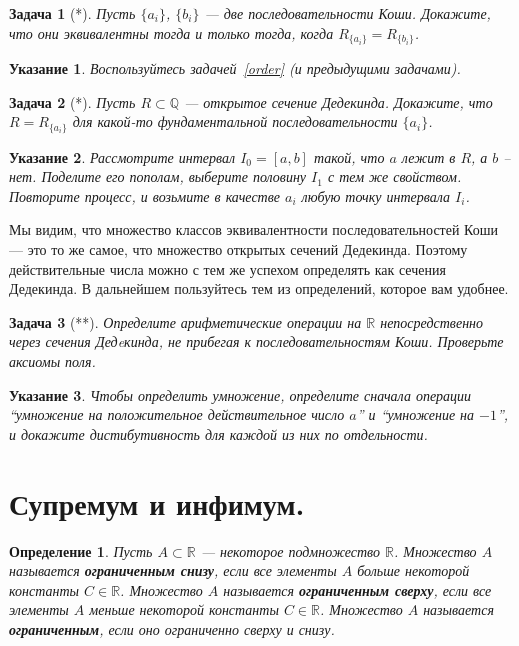 \documentclass[12pt]{book}
\newcommand{\subs}{\section}
\def\R{{\mathbb R}}
\def\Q{{\mathbb Q}}
\theoremstyle{upshape}
\newtheorem{zadacha}{Задача}[chapter]
\theoremstyle{generic}
\newtheorem{opredelenie}[teorema]{Определение}
\theoremstyle{upshapenonumber}
\newtheorem{ukazanie}{Указание}[section]
\newcommand{\следствие}{%
     \refstepcounter{teorema}
     {\noindent\bf Следствие \thechapter.\arabic{teorema}:\ }}
\newcommand{\пример}{%
     \refstepcounter{teorema}
     {\noindent\bf Пример \thechapter.\arabic{teorema}:\ }}
\newcommand{\лемма}{%
     \refstepcounter{teorema}
     {\noindent\bf Лемма \thechapter.\arabic{teorema}:\ }}
\newcommand{\теорема}{%
     \refstepcounter{teorema}
     {\noindent\bf Теорема \thechapter.\arabic{teorema}:\ }}
\newcommand{\утверждение}{%
     \refstepcounter{teorema}
     {\noindent\bf Утверждение \thechapter.\arabic{teorema}:\ }}
\begin{document}
\begin{zadacha}[*] Пусть $\{ a_i\}$, $\{b_i\}$ --- две последовательности
Коши. Докажите, что они эквивалентны тогда и только тогда, когда 
$R_{\{ a_i\}} = R_{\{ b_i\}}$.
\end{zadacha}

\begin{ukazanie}
Воспользуйтесь задачей~\ref{order} (и предыдущими задачами).
\end{ukazanie}

\begin{zadacha}[*]
Пусть $R \subset \Q$ --- открытое сечение Дедекинда. Докажите, что $R
= R_{\{a_i\}}$ для какой-то фундаментальной последовательности
$\{a_i\}$.
\end{zadacha}

\begin{ukazanie}
Рассмотрите интервал $I_0=[a,b]$ такой, что $a$ лежит в $R$, а $b$ --
нет. Поделите его пополам, выберите половину $I_1$ с тем же
свойством. Повторите процесс, и возьмите в качестве $a_i$ любую
точку интервала $I_i$.
\end{ukazanie} 

Мы видим, что множество классов эквивалентности последовательностей
Коши --- это то же самое, что множество открытых сечений
Дедекинда. Поэтому действительные числа можно с тем же успехом
определять как сечения Дедекинда. В дальнейшем пользуйтесь тем из
определений, которое вам удобнее.

\begin{zadacha}[**]
Определите арифметические операции на $\R$ непосредственно через
сечения Дедeкинда, не прибегая к последовательностям Коши. Проверьте
аксиомы поля.
\end{zadacha}

\begin{ukazanie}
Чтобы определить умножение, определите сначала операции ``умножение
на положительное действительное число $a$'' и ``умножение на $-1$'',
и докажите дистибутивность для каждой из них по отдельности.
\end{ukazanie}

\subs{Супремум и инфимум.}

\begin{opredelenie} Пусть $A\subset \R$ --- некоторое подмножество
$\R$. Множество $A$ называется {\bf ограниченным снизу}, если все
элементы $A$ больше некоторой константы $C\in \R$.  Множество $A$
называется {\bf ограниченным сверху}, если все элементы $A$ меньше
некоторой константы $C\in \R$. Множество $A$ называется {\bf
ограниченным}, если оно ограниченно сверху и снизу.
\end{opredelenie}
\end{document}
